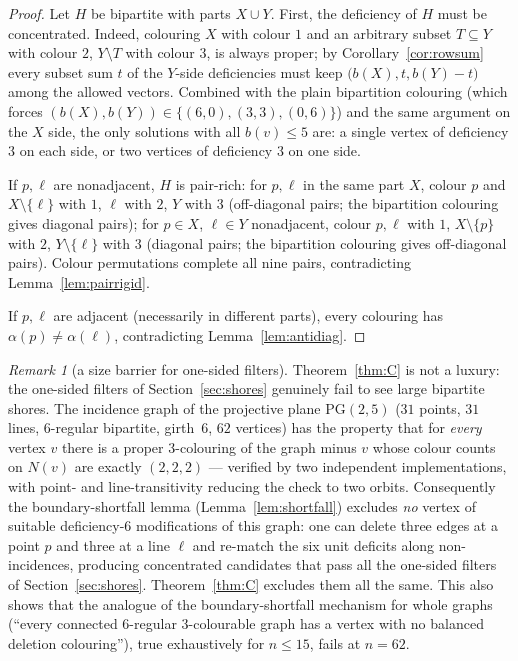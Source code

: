 \documentclass[11pt]{article}
\theoremstyle{remark}
\newtheorem{remark}[theorem]{Remark}
\begin{document}
\begin{proof}
Let $H$ be bipartite with parts $X\cup Y$. First, the deficiency of $H$ must be
concentrated. Indeed, colouring $X$ with colour $1$ and an arbitrary subset
$T\subseteq Y$ with colour $2$, $Y\setminus T$ with colour $3$, is always proper;
by Corollary~\ref{cor:rowsum} every subset sum $t$ of the $Y$-side deficiencies
must keep $\bigl(b(X),t,b(Y)-t\bigr)$ among the allowed vectors. Combined with
the plain bipartition colouring (which forces
$(b(X),b(Y))\in\{(6,0),(3,3),(0,6)\}$) and the same argument on the $X$ side,
the only solutions with all $b(v)\le 5$ are: a single vertex of deficiency $3$
on each side, or two vertices of deficiency $3$ on one side.

If $p,\ell$ are nonadjacent, $H$ is pair-rich: for $p,\ell$ in the same part
$X$, colour $p$ and $X\setminus\{\ell\}$ with $1$, $\ell$ with $2$, $Y$ with $3$
(off-diagonal pairs; the bipartition colouring gives diagonal pairs); for
$p\in X$, $\ell\in Y$ nonadjacent, colour $p,\ell$ with $1$, $X\setminus\{p\}$
with $2$, $Y\setminus\{\ell\}$ with $3$ (diagonal pairs; the bipartition
colouring gives off-diagonal pairs). Colour permutations complete all nine
pairs, contradicting Lemma~\ref{lem:pairrigid}.

If $p,\ell$ are adjacent (necessarily in different parts), every colouring has
$\alpha(p)\ne\alpha(\ell)$, contradicting Lemma~\ref{lem:antidiag}.
\end{proof}

\begin{remark}[a size barrier for one-sided filters]\label{rem:pg}
Theorem~\ref{thm:C} is not a luxury: the one-sided filters of
Section~\ref{sec:shores} genuinely fail to see large bipartite shores. The
incidence graph of the projective plane $\mathrm{PG}(2,5)$ ($31$ points, $31$
lines, $6$-regular bipartite, girth~$6$, $62$ vertices) has the property that
for \emph{every} vertex $v$ there is a proper $3$-colouring of the graph minus
$v$ whose colour counts on $N(v)$ are exactly $(2,2,2)$ --- verified by two
independent implementations, with point- and line-transitivity reducing the
check to two orbits. Consequently the boundary-shortfall lemma
(Lemma~\ref{lem:shortfall}) excludes \emph{no} vertex of suitable deficiency-$6$
modifications of this graph: one can delete three edges at a point $p$ and three
at a line $\ell$ and re-match the six unit deficits along non-incidences,
producing concentrated candidates that pass all the one-sided filters of
Section~\ref{sec:shores}. Theorem~\ref{thm:C} excludes them all the same. This
also shows that the analogue of the boundary-shortfall mechanism for whole
graphs (``every connected $6$-regular $3$-colourable graph has a vertex with no
balanced deletion colouring''), true exhaustively for $n\le 15$, fails at
$n=62$.
\end{remark}
\end{document}
